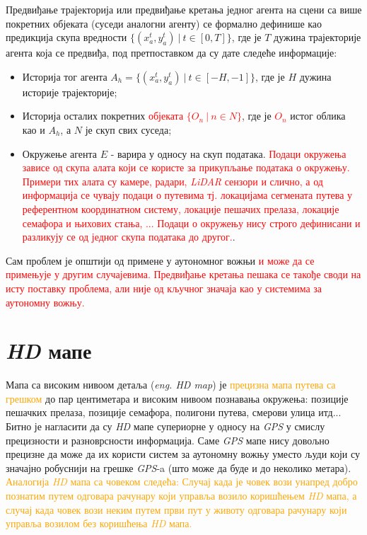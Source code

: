 \documentclass[11pt,oneside]{memoir}
\begin{document}
Предвиђање трајекторија или предвиђање кретања једног агента на сцени са више покретних објеката (суседи аналогни агенту) се формално
дефинише као предикција скупа вредности $\{(x^{t}_a, y^{t}_a)\ |\ t \in [0, T]\}$, где је $T$ дужина трајекторије агента која се предвиђа, 
под претпоставком да су дате следеће информације:
\begin{itemize}
  \item Историја тог агента $A_{h} = \{(x^{t}_a, y^{t}_a)\ |\ t \in [-H, -1]\}$, где је $H$ дужина историје трајекторије;
  \item Историја осталих покретних \textcolor{red}{објеката $\{O_{n}\ |\ n \in N\}$}, где је \textcolor{red}{$O_{n}$} истог облика као и $A_{h}$, а $N$ је скуп
        свих суседа;
  \item Окружење агента $E$ - варира у односу на скуп података. \textcolor{red}{Подаци окружења зависе од скупа алата који се користе
        за прикупљање података о окружењу. Примери тих алата су камере, радари, \textit{LiDAR} сензори и слично, а 
        од информација се чувају подаци о путевима тј. локацијама сегмената путева у референтном координатном систему,
        локације пешачих прелаза, локације семафора и њихових стања, ... Подаци о окружењу нису строго дефинисани и 
        разликују се од једног скупа података до другог.}.
\end{itemize}

Сам проблем је општији од примене у аутономног вожњи \textcolor{red}{и може да се примењује у другим случајевима. Предвиђање кретања пешака се
такође своди на исту поставку проблема, али није од кључног значаја као у системима за аутономну вожњу.}

\section{\textit{HD} мапе}

Мапа са високим нивоом детаља (\textit{eng. HD map}) је \textcolor{orange}{прецизна
мапа путева са грешком} до пар центиметара и високим нивоом
познавања окружења: позиције пешачких прелаза, позиције семафора, полигони путева, смерови улица итд... Битно је нагласити
да су \textit{HD} мапе супериорне у односу на \textit{GPS} у смислу прецизности и разноврсности информација. Саме \textit{GPS}
мапе нису довољно прецизне да може да их користи систем за аутономну вожњу уместо људи који су значајно робуснији на грешке
\textit{GPS}-a (што може да буде и до неколико метара). \textcolor{orange}{Аналогија 
\textit{HD} мапа са човеком следећа: Случај када је човек вози унапред добро познатим путем одговара рачунару који управља
возило коришћењем \textit{HD} мапа, а случај када човек вози неким путем први пут у животу одговара рачунару који управља возилом
без коришћења \textit{HD} мапа.}
\end{document}
